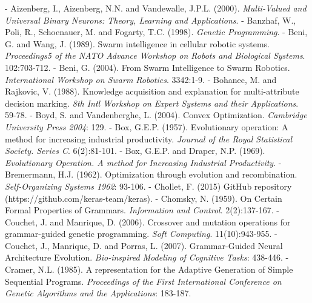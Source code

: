 \documentclass[spanish,a4paper,12pt,twoside]{report}
\begin{document}
  \newpage\cleardoublepage
  
  \begin{thebibliography}{00}
  \vspace{-1cm}
  \makeatletter
  \def\@biblabel#1{}
  \let\old@bibitem\bibitem
  \def\bibitem#1{\old@bibitem{#1}\leavevmode\kern-\bibindent}
  \makeatother
  
   Aizenberg, I., Aizenberg, N.N. and Vandewalle, J.P.L. (2000). \emph{Multi-Valued and Universal Binary Neurons: Theory, Learning and Applications}.
   Banzhaf, W., Poli, R., Schoenauer, M. and Fogarty, T.C. (1998). \emph{Genetic Programming}.
   Beni, G. and Wang, J. (1989). Swarm intelligence in cellular robotic systems. \emph{Proceedings5 of the NATO Advance Workshop on Robots and Biological Systems}. 102:703-712.
   Beni, G. (2004). From Swarm Intelligence to Swarm Robotics. \emph{International Workshop on Swarm Robotics}. 3342:1-9.
   Bohanec, M. and Rajkovic, V. (1988). Knowledge acquisition and explanation for multi-attribute decision marking. \emph{8th Intl Workshop on Expert Systems and their Applications}. 59-78.
   Boyd, S. and Vandenberghe, L. (2004). Convex Optimization. \emph{Cambridge University Press 2004}: 129.
   Box, G.E.P. (1957). Evolutionary operation: A method for increasing industrial productivity. \emph{Journal of the Royal Statistical Society. Series C}. 6(2):81-101.
   Box, G.E.P. and Draper, N.P. (1969). \emph{Evolutionary Operation. A method for Increasing Industrial Productivity}.
   Bremermann, H.J. (1962). Optimization through evolution and recombination. \emph{Self-Organizing Systems 1962}: 93-106.
   Chollet, F. (2015) GitHub repository (https://github.com/keras-team/keras).
   Chomsky, N. (1959). On Certain Formal Properties of Grammars. \emph{Information and Control}. 2(2):137-167.
   Couchet, J. and Manrique, D. (2006). Crossover and mutation operations for grammar-guided genetic programming. \emph{Soft Computing}. 11(10):943-955.
   Couchet, J., Manrique, D. and Porras, L. (2007). Grammar-Guided Neural Architecture Evolution. \emph{Bio-inspired Modeling of Cognitive Tasks}: 438-446.
   Cramer, N.L. (1985). A representation for the Adaptive Generation of Simple Sequential Programs. \emph{Proceedings of the First International Conference on Genetic Algorithms and the Applications}: 183-187.

\end{thebibliography}
\end{document}
